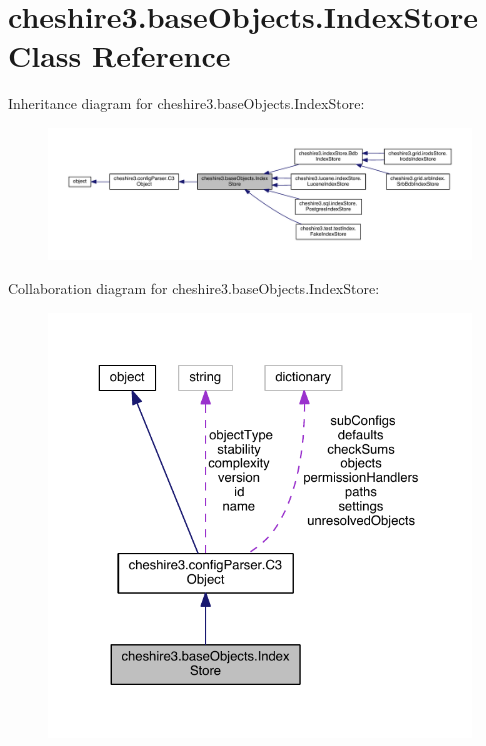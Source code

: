 \hypertarget{classcheshire3_1_1base_objects_1_1_index_store}{\section{cheshire3.\-base\-Objects.\-Index\-Store Class Reference}
\label{classcheshire3_1_1base_objects_1_1_index_store}
}


Inheritance diagram for cheshire3.\-base\-Objects.\-Index\-Store\-:
\nopagebreak
\begin{figure}[H]
\begin{center}
\leavevmode
\includegraphics[width=350pt]{classcheshire3_1_1base_objects_1_1_index_store__inherit__graph}
\end{center}
\end{figure}


Collaboration diagram for cheshire3.\-base\-Objects.\-Index\-Store\-:
\nopagebreak
\begin{figure}[H]
\begin{center}
\leavevmode
\includegraphics[width=325pt]{classcheshire3_1_1base_objects_1_1_index_store__coll__graph}
\end{center}
\end{figure}
